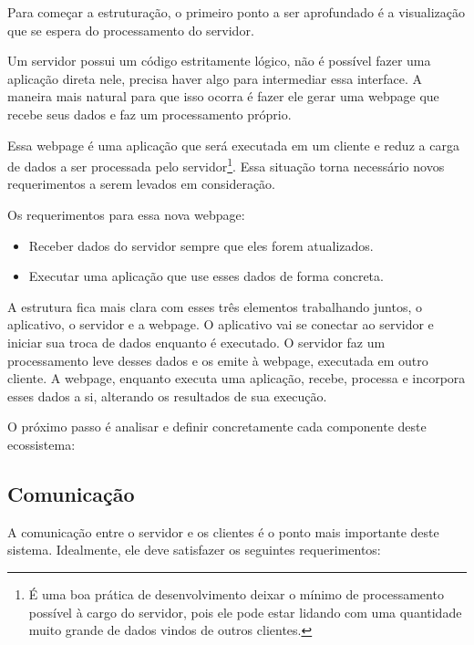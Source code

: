 \documentclass[a4paper,12pt]{article}
\begin{document}
Para começar a estruturação, o primeiro ponto a ser aprofundado é a visualização que se espera do processamento do servidor.

Um servidor possui um código estritamente lógico, não é possível fazer uma aplicação direta nele, precisa haver algo para intermediar essa interface. A maneira mais natural para que isso ocorra é fazer ele gerar uma webpage que recebe seus dados e faz um processamento próprio.

Essa webpage é uma aplicação que será executada em um cliente e reduz a carga de dados a ser processada pelo servidor\footnote{É uma boa prática de desenvolvimento deixar o mínimo de processamento possível à cargo do servidor, pois ele pode estar lidando com uma quantidade muito grande de dados vindos de outros clientes.}. Essa situação torna necessário novos requerimentos a serem levados em consideração.

Os requerimentos para essa nova webpage:

\begin{itemize}

    \item Receber dados do servidor sempre que eles forem atualizados.

    \item Executar uma aplicação que use esses dados de forma concreta.

\end{itemize}

A estrutura fica mais clara com esses três elementos trabalhando juntos, o aplicativo, o servidor e a webpage. O aplicativo vai se conectar ao servidor e iniciar sua troca de dados enquanto é executado. O servidor faz um processamento leve desses dados e os emite à webpage, executada em outro cliente. A webpage, enquanto executa uma aplicação, recebe, processa e incorpora esses dados a si, alterando os resultados de sua execução.

O próximo passo é analisar e definir concretamente cada componente deste ecossistema:





\newpage
\subsection{Comunicação}

A comunicação entre o servidor e os clientes é o ponto mais importante deste sistema. Idealmente, ele deve satisfazer os seguintes requerimentos:
\end{document}
